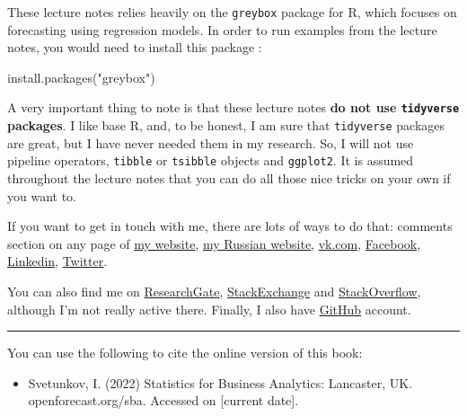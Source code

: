 \documentclass[
]{book}
\newenvironment{Shaded}{\begin{snugshade}}{\end{snugshade}}
\newcommand{\FunctionTok}[1]{\textcolor[rgb]{0.00,0.00,0.00}{#1}}
\newcommand{\NormalTok}[1]{#1}
\newcommand{\StringTok}[1]{\textcolor[rgb]{0.31,0.60,0.02}{#1}}
\providecommand{\tightlist}{%
  \setlength{\itemsep}{0pt}\setlength{\parskip}{0pt}}
\theoremstyle{definition}
\theoremstyle{definition}
\theoremstyle{definition}
\theoremstyle{definition}
\theoremstyle{remark}
\begin{document}
These lecture notes relies heavily on the \texttt{greybox} package for R, which focuses on forecasting using regression models. In order to run examples from the lecture notes, you would need to install this package \citep{R-greybox}:

\begin{Shaded}
\begin{Highlighting}[]
\FunctionTok{install.packages}\NormalTok{(}\StringTok{"greybox"}\NormalTok{)}
\end{Highlighting}
\end{Shaded}

A very important thing to note is that these lecture notes \textbf{do not use \texttt{tidyverse} packages}. I like base R, and, to be honest, I am sure that \texttt{tidyverse} packages are great, but I have never needed them in my research. So, I will not use pipeline operators, \texttt{tibble} or \texttt{tsibble} objects and \texttt{ggplot2}. It is assumed throughout the lecture notes that you can do all those nice tricks on your own if you want to.

If you want to get in touch with me, there are lots of ways to do that: comments section on any page of \href{https://forecasting.svetunkov.ru/}{my website}, \href{https://ivan.svetunkov.ru/}{my Russian website}, \href{https://vk.com/isvetunkov}{vk.com}, \href{https://www.facebook.com/isvetunkov}{Facebook}, \href{https://www.linkedin.com/in/isvetunkov}{Linkedin}, \href{https://twitter.com/iSvetunkov}{Twitter}.

You can also find me on \href{https://www.researchgate.net/profile/Ivan_Svetunkov}{ResearchGate}, \href{http://stats.stackexchange.com/users/87585/ivan-svetunkov}{StackExchange} and \href{http://stackoverflow.com/users/5296618/ivan-svetunkov}{StackOverflow}, although I'm not really active there. Finally, I also have \href{https://github.com/config-i1}{GitHub} account.

\begin{center}\rule{0.5\linewidth}{0.5pt}\end{center}

You can use the following to cite the online version of this book:

\begin{itemize}
\tightlist
\item
  Svetunkov, I. (2022) Statistics for Business Analytics: Lancaster, UK. openforecast.org/sba. Accessed on {[}current date{]}.
\end{itemize}
\end{document}
